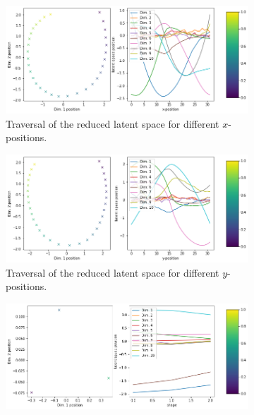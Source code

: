 \begin{figure}[H]
    \centering
    \begin{subfigure}{.48\textwidth}
        \includegraphics[width=\textwidth]{images/latent_space_traversals/vae_6250_dsprites_latent_space_values_x_position.png}
        \caption{Traversal of the reduced latent space for different $x$-positions.}
    \end{subfigure}
    \begin{subfigure}{.48\textwidth}
        \includegraphics[width=\textwidth]{images/latent_space_traversals/vae_6250_dsprites_latent_space_values_y_position.png}
        \caption{Traversal of the reduced latent space for different $y$-positions.}
    \end{subfigure}
    \begin{subfigure}{.48\textwidth}
        \includegraphics[width=\textwidth]{images/latent_space_traversals/vae_6250_dsprites_latent_space_values_shape.png}

\end{subfigure}
\end{figure}
